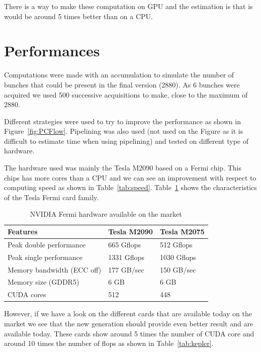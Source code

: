 There is a way to make these computation on \gls{GPU}\cite{Lahabar09} and the estimation is that is would be around 5 times better than on a \gls{CPU}.

\section{Performances}
\label{sec:perf}

Computations were made with an accumulation to simulate the number of bunches that could be present in the final version (2880). As 6 bunches were acquired we used 500 successive acquisitions to make, close to the maximum of 2880.

Different strategies were used to try to improve the performance as shown in Figure~\ref{fig:PCFlow}. Pipelining was also used (not used on the Figure as it is difficult to estimate time when using pipelining) and tested on different type of hardware.

The hardware used was mainly the Tesla M2090 based on a Fermi chip. This chips has more cores than a CPU and we can see an improvement with respect to computing speed as shown in Table~\ref{tab:speed}. Table~\ref{tab:fermi} shows the characteristics of the Tesla Fermi card family.

\begin{table}[H]
	\caption{NVIDIA Fermi hardware available on the market}
	\label{tab:fermi}
	\centering
	\begin{tabular}{|l|l|l|}
		\hline
			Features & Tesla M2090 & Tesla M2075 \\
		\hline
		\hline
			Peak double performance & 665 Gflops  & 512 Gflops \\
		\hline
			Peak single performance & 1331 Gflops & 1030 Gflops \\
		\hline
			Memory bandwidth (ECC off) & 177 GB/sec & 150 GB/sec \\
		\hline
			Memory size (GDDR5) & 6 GB & 6 GB \\
		\hline
			CUDA cores & 512 & 448 \\
		\hline
	\end{tabular}
\end{table}

However, if we have a look on the different cards that are available today on the market we see that the new generation should provide even better result and are available today. These cards show around 5 times the number of \gls{CUDA} core and around 10 times the number of \gls{flops} as shown in Table~\ref{tab:kepler}.

